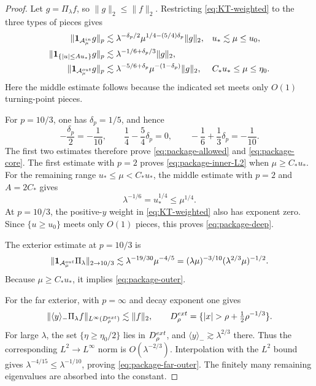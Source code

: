 \documentclass[10pt,a4paper]{amsart}
\numberwithin{equation}{section}
\newcommand{\one}{\mathbf 1}
\newcommand{\norm}[1]{\lVert #1\rVert}
\begin{document}
\begin{proof}
Let \(g=\Pi_\lambda f\), so \(\norm g_2\le\norm f_2\). Restricting
\eqref{eq:KT-weighted} to the three types of pieces gives
\begin{align*}
 \norm{\one_{\mathcal A_\mu^{\rm in}}g}_p
 &\lesssim
 \lambda^{-\delta_p/2}
 \mu^{1/4-(5/4)\delta_p}\norm g_2,
 &&u_*\lesssim\mu\le u_0,\\
 \norm{\one_{\{|u|\le Au_*\}}g}_p
 &\lesssim
 \lambda^{-1/6+\delta_p/3}\norm g_2,\\
 \norm{\one_{\mathcal A_\mu^{\rm out}}g}_p
 &\lesssim
 \lambda^{-5/6+\delta_p}
 \mu^{-(1-\delta_p)}\norm g_2,
 &&C_*u_*\le\mu\le\eta_0.
\end{align*}
Here the middle estimate follows because the indicated set meets only
\(O(1)\) turning-point pieces.

For \(p=10/3\), one has \(\delta_p=1/5\), and hence
\[
 -\frac{\delta_p}{2}=-\frac1{10},\qquad
 \frac14-\frac54\delta_p=0,
 \qquad
 -\frac16+\frac13\delta_p=-\frac1{10}.
\]
The first two estimates therefore prove \eqref{eq:package-allowed} and
\eqref{eq:package-core}. The first estimate with \(p=2\) proves
\eqref{eq:package-inner-L2} when \(\mu\ge C_*u_*\).
For the remaining range
\(u_*\le\mu<C_*u_*\), the middle estimate
with \(p=2\) and \(A=2C_*\) gives
\[
 \lambda^{-1/6}=u_*^{1/4}\le\mu^{1/4}.
\]
At
\(p=10/3\), the positive-\(y\) weight in \eqref{eq:KT-weighted} also has
exponent zero. Since
\(\{u\ge u_0\}\) meets only \(O(1)\) pieces, this proves
\eqref{eq:package-deep}.

The exterior estimate at \(p=10/3\) is
\[
 \norm{\one_{\mathcal A_\mu^{\rm out}}\Pi_\lambda}_{2\to10/3}
 \lesssim\lambda^{-19/30}\mu^{-4/5}
 =(\lambda\mu)^{-3/10}(\lambda^{2/3}\mu)^{-1/2}.
\]
Because \(\mu\ge C_*u_*\), it implies
\eqref{eq:package-outer}.

For the far exterior, \cite[Theorem~3(b)]{KochTataru} with \(p=\infty\)
and decay exponent one gives
\[
 \norm{\langle y\rangle_-\Pi_\lambda f}_{L^\infty(D_\rho^{\rm ext})}
 \lesssim\norm f_2,
 \qquad
 D_\rho^{\rm ext}=\{|x|>\rho+\tfrac12\rho^{-1/3}\}.
\]
For large \(\lambda\), the set \(\{\eta\ge\eta_0/2\}\) lies in
\(D_\rho^{\rm ext}\), and \(\langle y\rangle_-\gtrsim\lambda^{2/3}\)
there. Thus the corresponding \(L^2\to L^\infty\) norm is
\(O(\lambda^{-2/3})\). Interpolation with the \(L^2\) bound gives
\(\lambda^{-4/15}\le\lambda^{-1/10}\), proving
\eqref{eq:package-far-outer}. The finitely many remaining eigenvalues are
absorbed into the constant.
\end{proof}
\end{document}
